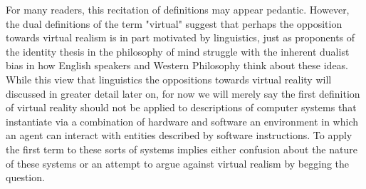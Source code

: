 For many readers, this recitation of definitions may appear pedantic. However, the dual definitions of the term "virtual" suggest that perhaps the opposition towards virtual realism is in part motivated by linguistics, just as proponents of the identity thesis in the philosophy of mind struggle with the inherent dualist bias in how English speakers and Western Philosophy think about these ideas. While this view that linguistics the oppositions towards virtual reality will discussed in greater detail later on, for now we will merely say the first definition of virtual reality should not be applied to descriptions of computer systems that instantiate via a combination of hardware and software an environment in which an agent can interact with entities described by software instructions. To apply the first term to these sorts of systems implies either confusion about the nature of these systems or an attempt to argue against virtual realism by begging the question. 
